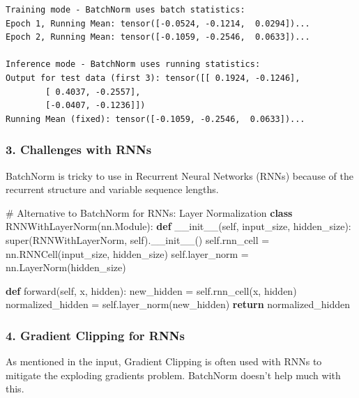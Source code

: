 \documentclass[
  letterpaper,
  DIV=11,
  numbers=noendperiod]{scrreprt}
\newenvironment{Shaded}{\begin{snugshade}}{\end{snugshade}}
\newcommand{\BuiltInTok}[1]{\textcolor[rgb]{0.00,0.23,0.31}{#1}}
\newcommand{\CommentTok}[1]{\textcolor[rgb]{0.37,0.37,0.37}{#1}}
\newcommand{\ControlFlowTok}[1]{\textcolor[rgb]{0.00,0.23,0.31}{\textbf{#1}}}
\newcommand{\FunctionTok}[1]{\textcolor[rgb]{0.28,0.35,0.67}{#1}}
\newcommand{\KeywordTok}[1]{\textcolor[rgb]{0.00,0.23,0.31}{\textbf{#1}}}
\newcommand{\NormalTok}[1]{\textcolor[rgb]{0.00,0.23,0.31}{#1}}
\newcommand{\OperatorTok}[1]{\textcolor[rgb]{0.37,0.37,0.37}{#1}}
\newcommand{\VariableTok}[1]{\textcolor[rgb]{0.07,0.07,0.07}{#1}}
\begin{document}
\begin{verbatim}
Training mode - BatchNorm uses batch statistics:
Epoch 1, Running Mean: tensor([-0.0524, -0.1214,  0.0294])...
Epoch 2, Running Mean: tensor([-0.1059, -0.2546,  0.0633])...

Inference mode - BatchNorm uses running statistics:
Output for test data (first 3): tensor([[ 0.1924, -0.1246],
        [ 0.4037, -0.2557],
        [-0.0407, -0.1236]])
Running Mean (fixed): tensor([-0.1059, -0.2546,  0.0633])...
\end{verbatim}

\subsubsection{3. Challenges with RNNs}\label{challenges-with-rnns}

BatchNorm is tricky to use in Recurrent Neural Networks (RNNs) because
of the recurrent structure and variable sequence lengths.

\begin{Shaded}
\begin{Highlighting}[]
\CommentTok{\# Alternative to BatchNorm for RNNs: Layer Normalization}
\KeywordTok{class}\NormalTok{ RNNWithLayerNorm(nn.Module):}
    \KeywordTok{def} \FunctionTok{\_\_init\_\_}\NormalTok{(}\VariableTok{self}\NormalTok{, input\_size, hidden\_size):}
        \BuiltInTok{super}\NormalTok{(RNNWithLayerNorm, }\VariableTok{self}\NormalTok{).}\FunctionTok{\_\_init\_\_}\NormalTok{()}
        \VariableTok{self}\NormalTok{.rnn\_cell }\OperatorTok{=}\NormalTok{ nn.RNNCell(input\_size, hidden\_size)}
        \VariableTok{self}\NormalTok{.layer\_norm }\OperatorTok{=}\NormalTok{ nn.LayerNorm(hidden\_size)}
        
    \KeywordTok{def}\NormalTok{ forward(}\VariableTok{self}\NormalTok{, x, hidden):}
\NormalTok{        new\_hidden }\OperatorTok{=} \VariableTok{self}\NormalTok{.rnn\_cell(x, hidden)}
\NormalTok{        normalized\_hidden }\OperatorTok{=} \VariableTok{self}\NormalTok{.layer\_norm(new\_hidden)}
        \ControlFlowTok{return}\NormalTok{ normalized\_hidden}
\end{Highlighting}
\end{Shaded}

\subsubsection{4. Gradient Clipping for
RNNs}\label{gradient-clipping-for-rnns}

As mentioned in the input, Gradient Clipping is often used with RNNs to
mitigate the exploding gradients problem. BatchNorm doesn't help much
with this.
\end{document}
